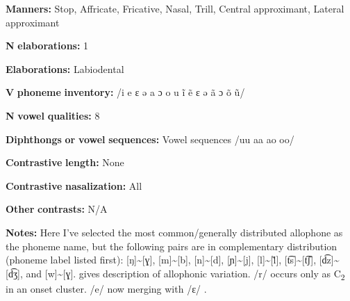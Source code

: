 \begin{styleBody}
\textbf{Manners:} Stop, Affricate, Fricative, Nasal, Trill, Central approximant, Lateral approximant
\end{styleBody}

\begin{styleBody}
\textbf{N} \textbf{elaborations:} 1
\end{styleBody}

\begin{styleBody}
\textbf{Elaborations:} Labiodental
\end{styleBody}

\begin{styleBody}
\textbf{V} \textbf{phoneme} \textbf{inventory:} /i e ɛ ə a ɔ o u ĩ ẽ ɛ ə ã ɔ õ ũ/
\end{styleBody}

\begin{styleBody}
\textbf{N} \textbf{vowel} \textbf{qualities:} 8
\end{styleBody}

\begin{styleBody}
\textbf{Diphthongs} \textbf{or} \textbf{vowel} \textbf{sequences:} Vowel sequences /uu aa ao oo/
\end{styleBody}

\begin{styleBody}
\textbf{Contrastive} \textbf{length:} None
\end{styleBody}

\begin{styleBody}
\textbf{Contrastive} \textbf{nasalization:} All
\end{styleBody}

\begin{styleBody}
\textbf{Other} \textbf{contrasts:} N/A
\end{styleBody}

\begin{styleBody}
\textbf{Notes:} Here I’ve selected the most common/generally distributed allophone as the phoneme name, but the following pairs are in complementary distribution (phoneme label listed first): [ŋ]{\textasciitilde}[ɣ], [m]{\textasciitilde}[b], [n]{\textasciitilde}[d], [ɲ]{\textasciitilde}[j], [l]{\textasciitilde}[\~{l}], [t͡s]{\textasciitilde}[t͡ʃ], [d͡z]{\textasciitilde}[d͡ʒ], and [w]{\textasciitilde}[ɣ]. \citet[10-18]{Duthie1996} gives description of allophonic variation. /r/ occurs only as C\textsubscript{2} in an onset cluster. /e/ now merging with /ɛ/ \citep[19]{Duthie1996}.
\end{styleBody}

